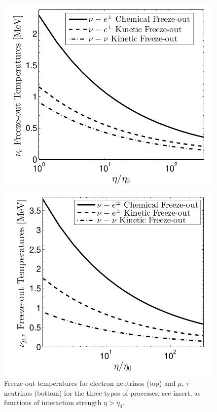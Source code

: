 \begin{figure}
\centerline{\includegraphics[width=0.82\linewidth]{04-birrell/ParametricStudies/Figures/nu_e_freezeout_GF.pdf}}
\centerline{\includegraphics[width=0.82\linewidth]{04-birrell/ParametricStudies/Figures/nu_mu_freezeout_GF.pdf}}
\caption{Freeze-out temperatures for electron neutrinos (top) and $\mu$, $\tau$ neutrinos (bottom) for the three types of processes, see insert, as functions of interaction strength $\eta>\eta_0$. }
\label{fig:freezeoutT_eta}
 \end{figure}


